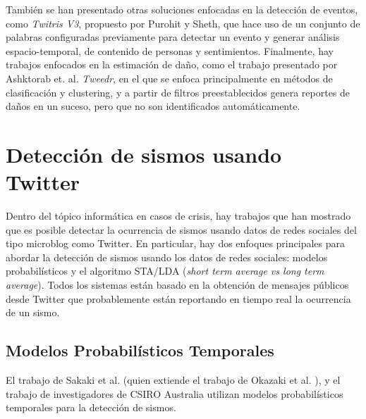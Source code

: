 También se han presentado otras soluciones enfocadas en la detección de eventos, como {\em Twitris V3}\cite{purohit2013twitris}, propuesto por Purohit y Sheth, que hace uso de un conjunto de palabras configuradas previamente para detectar un evento y generar análisis espacio-temporal, de contenido de personas y sentimientos. Finalmente, hay trabajos enfocados en la estimación de daño, como el trabajo presentado por Ashktorab et. al. \textit{Tweedr}\cite{ashktorab2014tweedr}, en el que se enfoca principalmente en métodos de clasificación y clustering, y a partir de filtros preestablecidos genera reportes de daños en un suceso, pero que no son identificados automáticamente.

\section{Detección de sismos usando Twitter}
\label{sec:deteccionsismos}

Dentro del tópico informática en casos de crisis, hay trabajos que han mostrado que es posible detectar la ocurrencia de sismos usando datos de redes sociales del tipo microblog como Twitter. 
%
En particular, hay dos enfoques principales para abordar la detección de sismos usando los datos de redes sociales: modelos probabilísticos y el algoritmo STA/LDA ({\em short term average vs long term average}). Todos los sistemas están basado en la obtención de mensajes públicos desde Twitter que probablemente están reportando en tiempo real la ocurrencia de un sismo. 

 
\subsection{Modelos Probabilísticos Temporales}
\label{sec:modelosprob}

El trabajo de Sakaki et al. \cite{sakaki2013tweet,sakaki2010earthquake} (quien extiende el trabajo de Okazaki et al. \cite{okazaki2010semantic}), y el trabajo de investigadores de CSIRO Australia \cite{yin2012using,robinson2013sensitive} utilizan modelos probabilísticos temporales para la detección de sismos. 

